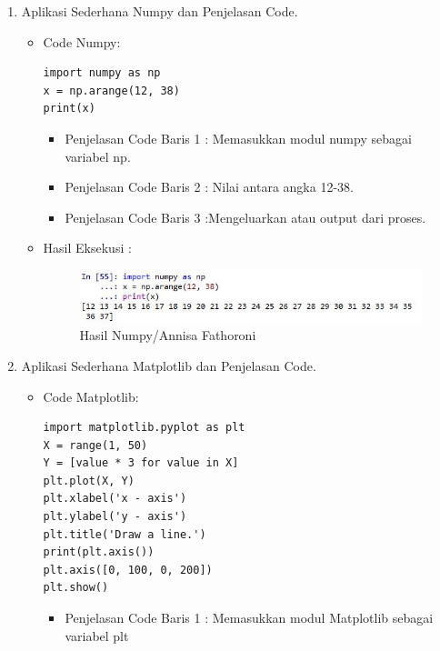 \begin{enumerate}
\begin{itemize}
\end{itemize}

\item Aplikasi Sederhana Numpy dan Penjelasan Code.
\begin{itemize}
\item Code Numpy:
 
\begin{verbatim}
import numpy as np
x = np.arange(12, 38)
print(x)
\end{verbatim}

\begin{itemize}
\item Penjelasan Code Baris 1 : Memasukkan modul numpy sebagai variabel np.

\item Penjelasan Code Baris 2 : Nilai antara angka 12-38.

\item Penjelasan Code Baris 3 :Mengeluarkan atau output dari proses.

\end{itemize}
\item Hasil Eksekusi :

\begin{figure}[ht]
\centering
\includegraphics[scale=0.6]{figures/Chapter3AnnisaFathoroniNumpy2.jpg}
\caption{Hasil Numpy/Annisa Fathoroni}
\label{contoh}
\end{figure}

\end{itemize}

\item Aplikasi Sederhana Matplotlib dan Penjelasan Code.
\begin{itemize}
\item Code Matplotlib:

\begin{verbatim}
import matplotlib.pyplot as plt
X = range(1, 50)
Y = [value * 3 for value in X]
plt.plot(X, Y)
plt.xlabel('x - axis')
plt.ylabel('y - axis')
plt.title('Draw a line.')
print(plt.axis()) 
plt.axis([0, 100, 0, 200]) 
plt.show()
\end{verbatim}

\begin{itemize}
\item Penjelasan Code Baris 1 : Memasukkan modul Matplotlib sebagai variabel plt


\end{itemize}
\end{itemize}
\end{enumerate}
